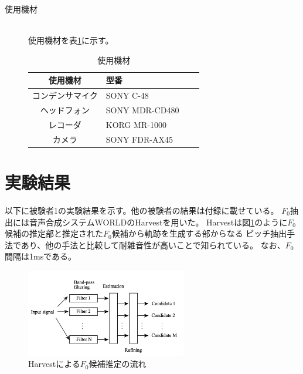 \documentclass[10.5ptj,a4j,dvipdfmx,uplatex, oneside, openany, report]{jsbook}%
\begin{document}
\begin{description}
    \item[使用機材]\mbox{}\\
        使用機材を表\ref{table:items}に示す。
        \begin{table}[h]
            \caption{使用機材}
            \label{table:items}
            \centering
            \begin{tabular}{clll}
                \hline
                使用機材 & 型番 \\
                \hline \hline
                コンデンサマイク & SONY C-48\\
                ヘッドフォン & SONY MDR-CD480\\
                レコーダ & KORG MR-1000\\
                カメラ & SONY FDR-AX45\\
                \hline
            \end{tabular}
        \end{table}
        
\end{description}








\section{実験結果}
以下に被験者1の実験結果を示す。他の被験者の結果は付録に載せている。
$F_0$抽出には音声合成システムWORLD\cite{world}のHarvest\cite{harvest}を用いた。
Harvestは図\ref{harvest}のように$F_0$候補の推定部と推定された$F_0$候補から軌跡を生成する部からなる
ピッチ抽出手法であり、他の手法と比較して耐雑音性が高いことで知られている。
なお、$F_0$間隔は1msである。

\begin{figure}[htbp]
    \begin{center}
      \includegraphics[clip,width=7.0cm]{harvest.png}
      \caption{Harvestによる$F_0$候補推定の流れ\cite{harvest}}
      \label{harvest}
    \end{center}
\end{figure}
\end{document}
